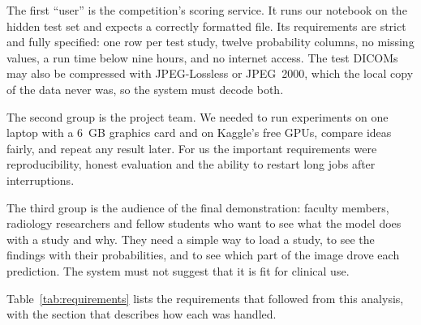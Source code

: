 The first ``user'' is the competition's scoring service. It runs our notebook on the hidden test set and expects a correctly formatted file. Its requirements are strict and fully specified: one row per test study, twelve probability columns, no missing values, a run time below nine hours, and no internet access. The test DICOMs may also be compressed with JPEG-Lossless or JPEG~2000, which the local copy of the data never was, so the system must decode both.

The second group is the project team. We needed to run experiments on one laptop with a 6~GB graphics card and on Kaggle's free GPUs, compare ideas fairly, and repeat any result later. For us the important requirements were reproducibility, honest evaluation and the ability to restart long jobs after interruptions.

The third group is the audience of the final demonstration: faculty members, radiology researchers and fellow students who want to see what the model does with a study and why. They need a simple way to load a study, to see the findings with their probabilities, and to see which part of the image drove each prediction. The system must not suggest that it is fit for clinical use.

Table~\ref{tab:requirements} lists the requirements that followed from this analysis, with the section that describes how each was handled.

